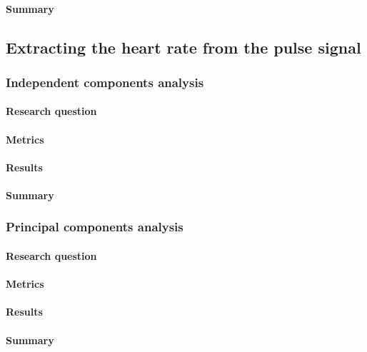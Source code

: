 \paragraph{Summary}

\subsection{Extracting the heart rate from the pulse signal}
\subsubsection{Independent components analysis}
\label{section:ica_assumption}
\paragraph{Research question}
\paragraph{Metrics}
\paragraph{Results}

\paragraph{Summary}

\subsubsection{Principal components analysis}
\paragraph{Research question}
\paragraph{Metrics}
\paragraph{Results}
%
\paragraph{Summary}

